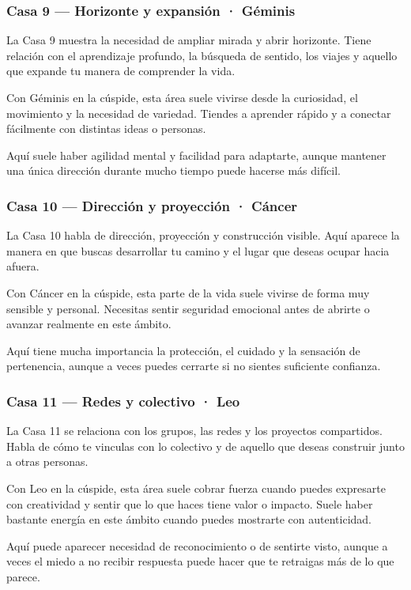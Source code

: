 \documentclass[11pt,a4paper]{article}
\begin{document}
\subsubsection*{Casa 9 — Horizonte y expansión · Géminis}
La Casa 9 muestra la necesidad de ampliar mirada y abrir horizonte. Tiene relación con el aprendizaje profundo, la búsqueda de sentido, los viajes y aquello que expande tu manera de comprender la vida.

Con Géminis en la cúspide, esta área suele vivirse desde la curiosidad, el movimiento y la necesidad de variedad. Tiendes a aprender rápido y a conectar fácilmente con distintas ideas o personas.

Aquí suele haber agilidad mental y facilidad para adaptarte, aunque mantener una única dirección durante mucho tiempo puede hacerse más difícil.

\subsubsection*{Casa 10 — Dirección y proyección · Cáncer}
La Casa 10 habla de dirección, proyección y construcción visible. Aquí aparece la manera en que buscas desarrollar tu camino y el lugar que deseas ocupar hacia afuera.

Con Cáncer en la cúspide, esta parte de la vida suele vivirse de forma muy sensible y personal. Necesitas sentir seguridad emocional antes de abrirte o avanzar realmente en este ámbito.

Aquí tiene mucha importancia la protección, el cuidado y la sensación de pertenencia, aunque a veces puedes cerrarte si no sientes suficiente confianza.

\subsubsection*{Casa 11 — Redes y colectivo · Leo}
La Casa 11 se relaciona con los grupos, las redes y los proyectos compartidos. Habla de cómo te vinculas con lo colectivo y de aquello que deseas construir junto a otras personas.

Con Leo en la cúspide, esta área suele cobrar fuerza cuando puedes expresarte con creatividad y sentir que lo que haces tiene valor o impacto. Suele haber bastante energía en este ámbito cuando puedes mostrarte con autenticidad.

Aquí puede aparecer necesidad de reconocimiento o de sentirte visto, aunque a veces el miedo a no recibir respuesta puede hacer que te retraigas más de lo que parece.
\end{document}
